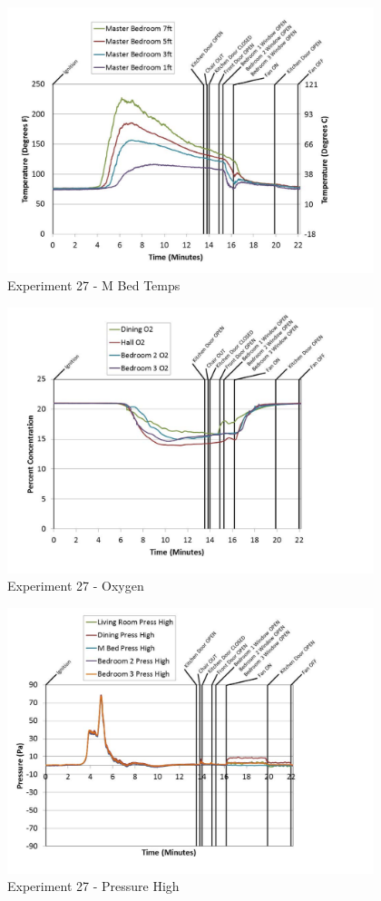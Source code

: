 \documentclass{article}
\begin{document}
\begin{appendices}
	\begin{figure}[h!]
		\centering
		\includegraphics[height=3.05in]{0_Images/Results_Charts/Exp_27_Charts/MBedTemps.pdf}
		\caption{Experiment 27 - M Bed Temps}
	\end{figure}
 
	\clearpage

	\begin{figure}[h!]
		\centering
		\includegraphics[height=3.05in]{0_Images/Results_Charts/Exp_27_Charts/Oxygen.pdf}
		\caption{Experiment 27 - Oxygen}
	\end{figure}
 

	\begin{figure}[h!]
		\centering
		\includegraphics[height=3.05in]{0_Images/Results_Charts/Exp_27_Charts/PressureHigh.pdf}
		\caption{Experiment 27 - Pressure High}
	\end{figure}
 

\end{appendices}
\end{document}

